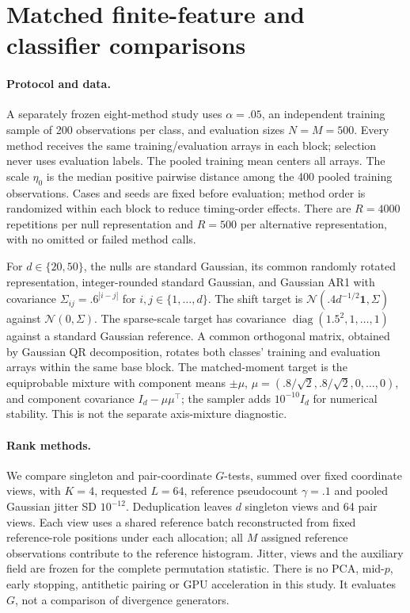 {\color{blue}
\section{Matched finite-feature and classifier comparisons}
\label{app:matched-comparators}

\paragraph{Protocol and data.}
A separately frozen eight-method study uses $\alpha=.05$, an independent
training sample of 200 observations per class, and evaluation sizes $N=M=500$.
Every method receives the same training/evaluation arrays in each block;
selection never uses evaluation labels. The pooled training mean centers all
arrays. The scale $\eta_0$ is the median positive pairwise distance among the
400 pooled training observations. Cases and seeds are fixed before evaluation;
method order is randomized within each block to reduce timing-order effects.
There are $R=4000$ repetitions per null representation and $R=500$ per
alternative representation, with no omitted or failed method calls.

For $d\in\{20,50\}$, the nulls are standard Gaussian, its common randomly
rotated representation, integer-rounded standard Gaussian, and Gaussian AR1
with covariance $\Sigma_{ij}=.6^{|i-j|}$ for $i,j\in\{1,\ldots,d\}$.
The shift target is $\mathcal N(.4d^{-1/2}\mathbf1,\Sigma)$ against
$\mathcal N(0,\Sigma)$. The sparse-scale target has covariance
$\operatorname{diag}(1.5^2,1,\ldots,1)$ against a standard Gaussian reference.
A common orthogonal matrix, obtained by Gaussian QR decomposition, rotates
both classes' training and evaluation arrays within the same base block.
The matched-moment target is the equiprobable mixture with component means
$\pm\mu$, $\mu=(.8/\sqrt2,.8/\sqrt2,0,\ldots,0)$, and component covariance
$I_d-\mu\mu^\top$; the sampler adds $10^{-10}I_d$ for numerical stability.
This is not the separate axis-mixture diagnostic.

\paragraph{Rank methods.}
We compare singleton and pair-coordinate $G$-tests, summed over fixed coordinate
views, with $K=4$, requested $L=64$, reference pseudocount $\gamma=.1$ and
pooled Gaussian jitter SD $10^{-12}$. Deduplication leaves $d$ singleton views
and 64 pair views. Each view uses a shared reference batch reconstructed from
fixed reference-role positions under each allocation; all $M$ assigned reference
observations contribute to the reference histogram. Jitter, views and the
auxiliary field are frozen for the complete permutation statistic. There is no
PCA, mid-$p$, early stopping, antithetic pairing or GPU acceleration in this
study. It evaluates $G$, not a comparison of divergence generators.

}

